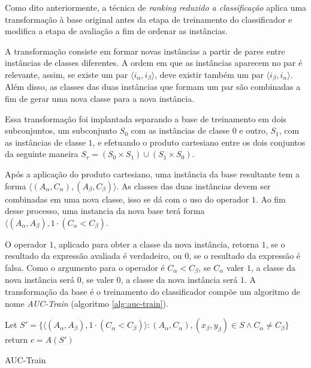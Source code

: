 Como dito anteriormente, a técnica de \emph{ranking reduzido a classificação} aplica uma transformação à base original antes da etapa de treinamento do classificador e modifica a etapa de avaliação a fim de ordenar as instâncias.

A transformação consiste em formar novas instâncias a partir de pares entre instâncias de classes diferentes. A ordem em que as instâncias aparecem no par é relevante, assim, se existe um par $\langle i_\alpha, i_\beta \rangle$, deve existir também um par $\langle i_\beta, i_\alpha \rangle$. Além disso, as classes das duas instâncias que formam um par são combinadas a fim de gerar uma nova classe para a nova instância.

Essa transformação foi implantada separando a base de treinamento em dois subconjuntos, um subconjunto $S_0$ com as instâncias de classe $0$ e outro, $S_1$, com as instâncias de classe $1$, e efetuando o produto cartesiano entre os dois conjuntos da seguinte maneira $S_r = (S_0 \times S_1) \cup (S_1 \times S_0)$.

Após a aplicação do produto cartesiano, uma instância da base resultante tem a forma $\langle (A_\alpha, C_\alpha), (A_\beta, C_\beta) \rangle$. As classes das duas instâncias devem ser combinadas em uma nova classe, isso se dá com o uso do operador $1$. Ao fim desse processo, uma instancia da nova base terá forma $\langle (A_\alpha, A_\beta), 1 \cdot (C_\alpha < C_\beta)$.

O operador $1$, aplicado para obter a classe da nova instância, retorna $1$, se o resultado da expressão avaliada é verdadeiro, ou $0$, se o resultado da expressão é falsa. Como o argumento para o operador é $C_\alpha < C_\beta$, se $C_\alpha$ valer $1$, a classe da nova instância será $0$, se valer $0$, a classe da nova instância será $1$. A transformação da base é o treinamento do classificador compõe um algoritmo de nome \emph{AUC-Train} (algoritmo \ref{alg:auc-train}).

\begin{algorithm}
    \begin{algorithmic}

        \STATE Let $S' = \{\langle (A_\alpha, A_\beta), 1 \cdot (C_\alpha < C_\beta) \rangle : (A_\alpha, C_\alpha), (x_\beta, y_\beta) \in S \wedge C_\alpha \neq C_\beta\}$
        \STATE return $c = A(S')$

        \caption{AUC-Train}
        \label{alg:auc-train}

    \end{algorithmic}
\end{algorithm}

